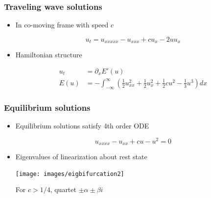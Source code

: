 \documentclass[16pt]{beamer}
\begin{document}
\begin{frame}
	\frametitle{Traveling wave solutions}
	\fontsize{16}{7.2}\selectfont
	\begin{itemize}
		\item In co-moving frame with speed $c$
		\begin{center}
		\[ u_t = u_{xxxxx} - u_{xxx} + c u_x - 2 u u_x \]
		\end{center}

		\item Hamiltonian structure
		\begin{center}
		\begin{align*} 
			u_t &= \partial_x E'(u) \\
			E(u) &= -\int_{-\infty}^{\infty} \left( \frac{1}{2}u_{xx}^2 + \frac{1}{2}u_x^2 + \frac{1}{2}cu^2 - \frac{1}{3}u^3 \right) dx 
		\end{align*}
		\end{center}
	\end{itemize}
\end{frame}

\begin{frame}
	\frametitle{Equilibrium solutions}
	\fontsize{16}{7.2}\selectfont
	\begin{itemize}
		\item Equilibrium solutions satisfy 4th order ODE
		\begin{center}
		\[u_{xxxx} - u_{xx} + cu - u^2 = 0\]
		\end{center}
		\vspace{0.25cm}
		\item Eigenvalues of linearization about rest state
		\begin{center}
		\texttt{[image: images/eigbifurcation2]}
		\end{center}
		For $c > 1/4$, quartet $\pm \alpha \pm \beta i$
	\end{itemize}
\end{frame}
\end{document}
